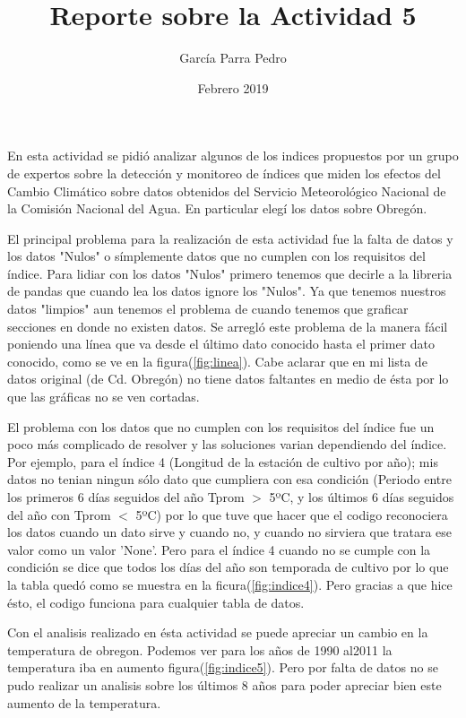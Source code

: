 \documentclass[12pt]{article}
\title{Reporte sobre la Actividad 5}
\author{García Parra Pedro}
\date{Febrero 2019}
\begin{document}
\maketitle

En esta actividad se pidió analizar algunos de los indices propuestos por un grupo de expertos sobre la detección y monitoreo de índices que miden los efectos del Cambio Climático sobre datos obtenidos del Servicio Meteorológico Nacional de la Comisión Nacional del Agua. En particular elegí los datos sobre Obregón. 

El principal problema para la realización de esta actividad fue la falta de datos y los datos "Nulos" o símplemente datos que no cumplen con los requisitos del índice.
Para lidiar con los datos "Nulos" primero tenemos que decirle a la libreria de pandas que cuando lea los datos ignore los "Nulos". Ya que tenemos nuestros datos "limpios" aun tenemos el problema de cuando tenemos que graficar secciones en donde no existen datos. Se arregló este problema de la manera fácil poniendo una línea que va desde el último dato conocido hasta el primer dato conocido, como se ve en la figura(\ref{fig:linea}). Cabe aclarar que en mi lista de datos original (de Cd. Obregón) no tiene datos faltantes en medio de ésta por lo que las gráficas no se ven cortadas.

El problema con los datos que no cumplen con los requisitos del índice fue un poco más complicado de resolver y las soluciones varian dependiendo del índice.
Por ejemplo, para el índice 4 (Longitud de la estación de cultivo por año); mis datos no tenian ningun sólo dato que cumpliera con esa condición (Periodo entre los primeros 6 días seguidos del año  Tprom $>$ 5ºC, y los últimos 6 días seguidos del año con Tprom $<$ 5ºC) por lo que tuve que hacer que el codigo reconociera los datos cuando un dato sirve y cuando no, y cuando no sirviera que tratara ese valor como un valor 'None'. Pero para el índice 4 cuando no se cumple con la condición se dice que todos los días del año son temporada de cultivo por lo que la tabla quedó como se muestra en la ficura(\ref{fig:indice4}). Pero gracias a que hice ésto, el codigo funciona para cualquier tabla de datos.

Con el analisis realizado en ésta actividad se puede apreciar un cambio en la temperatura de obregon. Podemos ver para los años de 1990 al2011 la temperatura iba en aumento figura(\ref{fig:indice5}). Pero por falta de datos no se pudo realizar un analisis sobre los últimos 8 años para poder apreciar bien este aumento de la temperatura.
\end{document}
